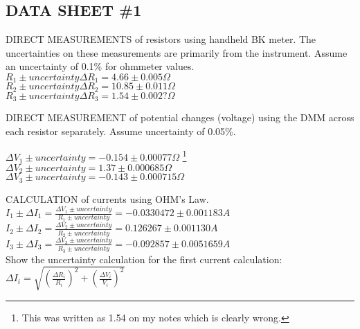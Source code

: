 \subsection{DATA SHEET \#1}
	\item DIRECT MEASUREMENTS of resistors using handheld BK meter.  The uncertainties on these measurements are primarily from the instrument.  Assume an uncertainty of 0.1\% for ohmmeter values.\\
	
	$R_1 \pm uncertainty \Delta R_1 = 4.66 \pm 0.005 \Omega$ \\ 
	$R_2 \pm uncertainty \Delta R_2 = 10.85 \pm 0.011 \Omega$ \\ 
	$R_3 \pm uncertainty \Delta R_3 = 1.54 \pm 0.002? \Omega$\\ 
	
	\item DIRECT MEASUREMENT of potential changes (voltage) using the DMM across each resistor separately.  Assume uncertainty of 0.05\%.
	
	$\Delta V_1 \pm uncertainty = -0.154 \pm 0.00077 \Omega $ \footnote{This was written as 1.54 on my notes which is clearly wrong.}  \\ 
	$\Delta V_2 \pm uncertainty = 1.37 \pm 0.000685 \Omega $ \\ 
	$\Delta V_3 \pm uncertainty = -0.143 \pm 0.000715 \Omega $ \\
	
	\item CALCULATION of currents using OHM's Law.\\
	
	$I_1 \pm \Delta I_1 = \frac{\Delta V_1 \pm uncertainty}{R_1 \pm uncertainty} = -0.0330472 \pm  0.001183 A$ \\ 
	$I_2 \pm \Delta I_2 = \frac{\Delta V_2 \pm uncertainty}{R_2 \pm uncertainty} = 0.126267 \pm  0.001130 A$ \\
 	$I_3 \pm \Delta I_3 = \frac{\Delta V_3 \pm uncertainty}{R_3 \pm uncertainty} = -0.092857 \pm  0.0051659 A$ \\
	
	Show the uncertainty calculation for the first current calculation:\\
	
	$ \Delta I_i = \sqrt{(\frac{\Delta R_i}{R_i})^2 + (\frac{\Delta V_i}{V_i})^2} $ \\